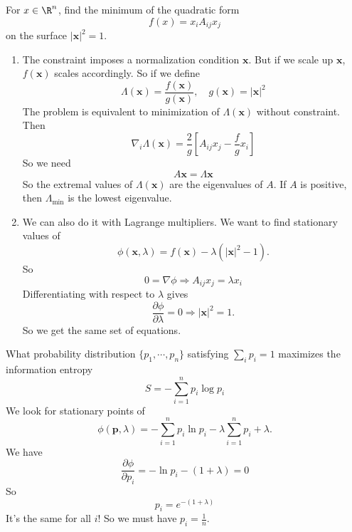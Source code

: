 \documentclass[a4paper]{article}
\begin{document}
\begin{eg}
  For $x\in \R^n$, find the minimum of the quadratic form
  \[
    f(x) = x_i A_{ij}x_j
  \]
  on the surface $|\mathbf{x}|^2 = 1$.

  \begin{enumerate}
  \item The constraint imposes a normalization condition $\mathbf{x}$. But if we scale up $\mathbf{x}$, $f(\mathbf{x})$ scales accordingly. So if we define
    \[
      \Lambda(\mathbf{x}) = \frac{f(\mathbf{x})}{g(\mathbf{x})},\quad g(\mathbf{x}) = |\mathbf{x}|^2
    \]
    The problem is equivalent to minimization of $\Lambda (\mathbf{x})$ without constraint. Then
    \[
      \nabla_i \Lambda(\mathbf{x}) = \frac{2}{g}\left[A_{ij} x_j - \frac{f}{g} x_i\right]
    \]
    So we need
    \[
      A\mathbf{x} = \Lambda \mathbf{x}
    \]
    So the extremal values of $\Lambda (\mathbf{x})$ are the eigenvalues of $A$. If $A$ is positive, then $\Lambda_{\min}$ is the lowest eigenvalue.

  \item We can also do it with Lagrange multipliers. We want to find stationary values of 
    \[
      \phi(\mathbf{x}, \lambda) = f(\mathbf{x}) - \lambda(|\mathbf{x}|^2 - 1).
    \]
    So
    \[
      0 = \nabla \phi \Rightarrow  A_{ij} x_j = \lambda x_i
    \]
    Differentiating with respect to $\lambda$ gives
    \[
      \frac{\partial \phi}{\partial \lambda} = 0 \Rightarrow  |\mathbf{x}|^2 = 1.
    \]
    So we get the same set of equations.
  \end{enumerate}
\end{eg}

\begin{eg}
  What probability distribution $\{p_1, \cdots, p_n\}$ satisfying $\sum_i p_i = 1$ maximizes the information entropy
  \[
    S = - \sum_{i = 1}^n p_i \log p_i
  \]
  We look for stationary points of
  \[
    \phi(\mathbf{p}, \lambda) = -\sum_{i = 1}^n p_i \ln p_i - \lambda\sum_{i = 1}^n p_i + \lambda.
  \]
  We have
  \[
    \frac{\partial \phi}{\partial p_i}= - \ln p_i - (1 + \lambda) = 0
  \]
  So
  \[
    p_i = e^{-(1 + \lambda)}
  \]
  It's the same for all $i$! So we must have $p_i = \frac{1}{n}$.
\end{eg}
\end{document}
